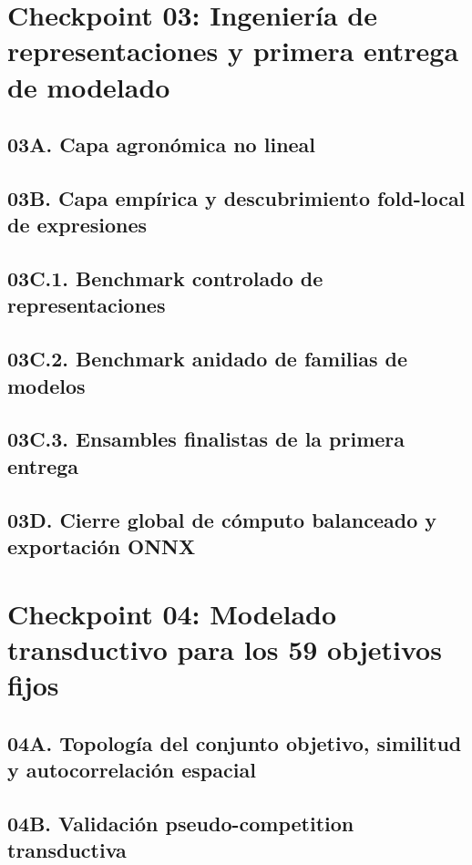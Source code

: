 \documentclass[11pt,oneside]{report}
\begin{document}
\chapter{Checkpoint 03: Ingeniería de representaciones y primera entrega de modelado}
\label{chap:checkpoint03}
\section{03A. Capa agronómica no lineal}
\label{sec:checkpoint03a}

\section{03B. Capa empírica y descubrimiento fold-local de expresiones}
\label{sec:checkpoint03b}

\section{03C.1. Benchmark controlado de representaciones}
\label{sec:checkpoint03c1}

\section{03C.2. Benchmark anidado de familias de modelos}
\label{sec:checkpoint03c2}

\section{03C.3. Ensambles finalistas de la primera entrega}
\label{sec:checkpoint03c3}

\section{03D. Cierre global de cómputo balanceado y exportación ONNX}
\label{sec:checkpoint03d}

\chapter{Checkpoint 04: Modelado transductivo para los 59 objetivos fijos}
\label{chap:checkpoint04}
\section{04A. Topología del conjunto objetivo, similitud y autocorrelación espacial}
\label{sec:checkpoint04a}

\section{04B. Validación pseudo-competition transductiva}
\label{sec:checkpoint04b}

\end{document}
